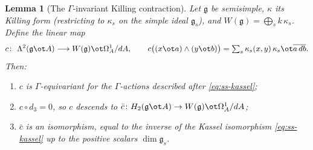 \documentclass{amsart}
\newtheorem{lemma}{Lemma}
\theoremstyle{definition}
\newcommand{\g}{\mathfrak{g}}
\newcommand{\Om}{\Omega}
\newcommand{\Gm}{\Gamma}
\newcommand{\ra}{\rightarrow}
\begin{document}
\begin{lemma}[The $\Gm$-invariant Killing contraction]\label{lem:kappa}
Let $\g$ be semisimple, $\kappa$ its Killing form (restricting to $\kappa_s$ on the
simple ideal $\g_s$), and $W(\g)=\bigoplus_s k\,\kappa_s$.  Define the linear map
\[
   c\colon\ \Lambda^2(\g\ot A)\longrightarrow W(\g)\ot\Om^1_A/dA,\qquad
   c\bigl((x\ot a)\wedge(y\ot b)\bigr)=\textstyle\sum_s\kappa_s(x,y)\,\kappa_s\ot\overline{a\,db}.
\]
Then:
\begin{enumerate}
\item[(i)] $c$ is $\Gm$-equivariant for the $\Gm$-actions described after
\eqref{eq:ss-kassel};
\item[(ii)] $c\circ d_3=0$, so $c$ descends to $\bar c\colon H_2(\g\ot A)\ra
W(\g)\ot\Om^1_A/dA$;
\item[(iii)] $\bar c$ is an isomorphism, equal to the inverse of the Kassel
isomorphism \eqref{eq:ss-kassel} up to the positive scalars $\dim\g_s$.
\end{enumerate}
\end{lemma}
\end{document}
